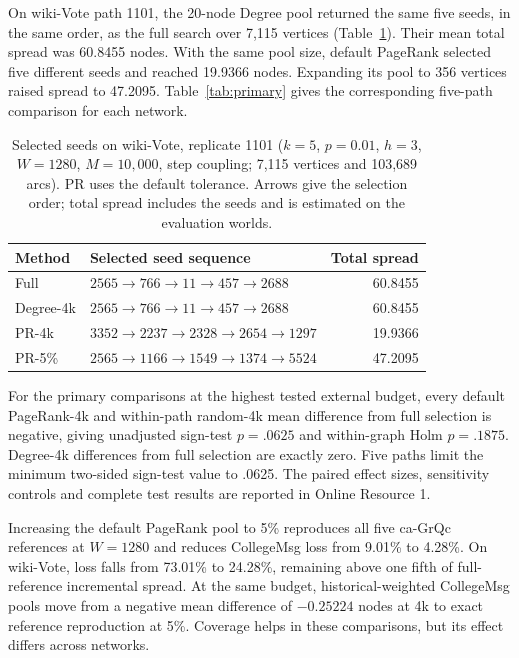 \documentclass[smallextended]{svjour3}
\newcommand{\CollegePRLoss}{9.01}
\newcommand{\CollegePRfiveLoss}{4.28}
\newcommand{\WikiPRLoss}{73.01}
\newcommand{\WikiPRfiveLoss}{24.28}
\begin{document}
On wiki-Vote path 1101, the 20-node Degree pool returned the same five seeds, in the same order, as the full search over 7,115 vertices (Table~\ref{tab:case}). Their mean total spread was 60.8455 nodes. With the same pool size, default PageRank selected five different seeds and reached 19.9366 nodes. Expanding its pool to 356 vertices raised spread to 47.2095. Table~\ref{tab:primary} gives the corresponding five-path comparison for each network.
\begin{table}[htbp]
\caption{Selected seeds on wiki-Vote, replicate 1101 ($k=5$, $p=0.01$, $h=3$, $W=1280$, $M=10{,}000$, step coupling; 7,115 vertices and 103,689 arcs). PR uses the default tolerance. Arrows give the selection order; total spread includes the seeds and is estimated on the evaluation worlds.}\label{tab:case}
\begin{tabularx}{\linewidth}{lXr}\toprule
Method & Selected seed sequence & Total spread \\ \midrule
Full & $2565\to 766\to 11\to 457\to 2688$ & 60.8455 \\
Degree-4k & $2565\to 766\to 11\to 457\to 2688$ & 60.8455 \\
PR-4k & $3352\to 2237\to 2328\to 2654\to 1297$ & 19.9366 \\
PR-5\% & $2565\to 1166\to 1549\to 1374\to 5524$ & 47.2095 \\
\bottomrule\end{tabularx}
\end{table}

For the primary comparisons at the highest tested external budget, every default PageRank-4k and within-path random-4k mean difference from full selection is negative, giving unadjusted sign-test $p=.0625$ and within-graph Holm $p=.1875$. Degree-4k differences from full selection are exactly zero. Five paths limit the minimum two-sided sign-test value to .0625. The paired effect sizes, sensitivity controls and complete test results are reported in Online Resource 1.

Increasing the default PageRank pool to 5\% reproduces all five ca-GrQc references at $W=1280$ and reduces CollegeMsg loss from \CollegePRLoss{}\% to \CollegePRfiveLoss{}\%. On wiki-Vote, loss falls from \WikiPRLoss{}\% to \WikiPRfiveLoss{}\%, remaining above one fifth of full-reference incremental spread. At the same budget, historical-weighted CollegeMsg pools move from a negative mean difference of $-0.25224$ nodes at 4k to exact reference reproduction at 5\%. Coverage helps in these comparisons, but its effect differs across networks.
\end{document}
